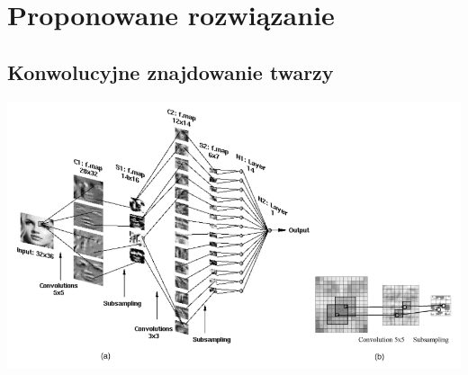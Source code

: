 \documentclass[11pt,a4paper]{article}
\begin{document}
\section{Proponowane rozwiązanie}
\subsection{Konwolucyjne znajdowanie twarzy}
\vspace*{1cm}
\includegraphics[scale=0.7]{schemat}
\vspace*{1cm}
\end{document}
